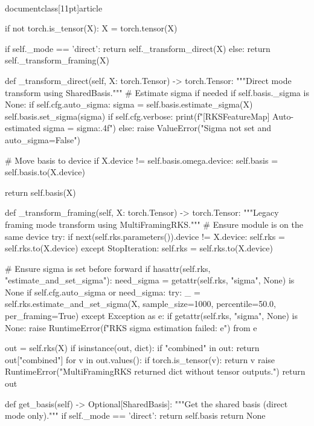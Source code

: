 \\documentclass[11pt]{article}
\begin{document}
\begin{CodeBlock}
        if not torch.is_tensor(X):
            X = torch.tensor(X)

        if self._mode == 'direct':
            return self._transform_direct(X)
        else:
            return self._transform_framing(X)
    
    def _transform_direct(self, X: torch.Tensor) -> torch.Tensor:
        """Direct mode transform using SharedBasis."""
        # Estimate sigma if needed
        if self.basis._sigma is None:
            if self.cfg.auto_sigma:
                sigma = self.basis.estimate_sigma(X)
                self.basis.set_sigma(sigma)
                if self.cfg.verbose:
                    print(f"[RKSFeatureMap] Auto-estimated sigma = {sigma:.4f}")
            else:
                raise ValueError("Sigma not set and auto_sigma=False")
        
        # Move basis to device
        if X.device != self.basis.omega.device:
            self.basis = self.basis.to(X.device)
        
        return self.basis(X)
    
    def _transform_framing(self, X: torch.Tensor) -> torch.Tensor:
        """Legacy framing mode transform using MultiFramingRKS."""
        # Ensure module is on the same device
        try:
            if next(self.rks.parameters()).device != X.device:
                self.rks = self.rks.to(X.device)
        except StopIteration:
            self.rks = self.rks.to(X.device)

        # Ensure sigma is set before forward
        if hasattr(self.rks, "estimate_and_set_sigma"):
            need_sigma = getattr(self.rks, "sigma", None) is None
            if self.cfg.auto_sigma or need_sigma:
                try:
                    _ = self.rks.estimate_and_set_sigma(X, sample_size=1000, percentile=50.0, per_framing=True)
                except Exception as e:
                    if getattr(self.rks, "sigma", None) is None:
                        raise RuntimeError(f"RKS sigma estimation failed: {e}") from e

        out = self.rks(X)
        if isinstance(out, dict):
            if "combined" in out:
                return out["combined"]
            for v in out.values():
                if torch.is_tensor(v):
                    return v
            raise RuntimeError("MultiFramingRKS returned dict without tensor outputs.")
        return out
    
    def get_basis(self) -> Optional[SharedBasis]:
        """Get the shared basis (direct mode only)."""
        if self._mode == 'direct':
            return self.basis
        return None
    

\end{CodeBlock}
\end{document}

